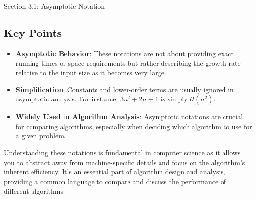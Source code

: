\begin{notes}{Section 3.1: Asymptotic Notation}
    \subsection*{Key Points}

    \begin{itemize}
        \item \textbf{Asymptotic Behavior}: These notations are not about providing exact running times or space requirements but rather describing the growth rate relative to the input size as it 
        becomes very large.
        \item \textbf{Simplification}: Constants and lower-order terms are usually ignored in asymptotic analysis. For instance, $3n^{2} + 2n + 1$ is simply $\mathcal{O}(n^{2})$.
        \item \textbf{Widely Used in Algorithm Analysis}: Asymptotic notations are crucial for comparing algorithms, especially when deciding which algorithm to use for a given problem.
    \end{itemize}

    Understanding these notations is fundamental in computer science as it allows you to abstract away from machine-specific details and focus on the algorithm's inherent efficiency. It's an essential 
    part of algorithm design and analysis, providing a common language to compare and discuss the performance of different algorithms.
\end{notes}